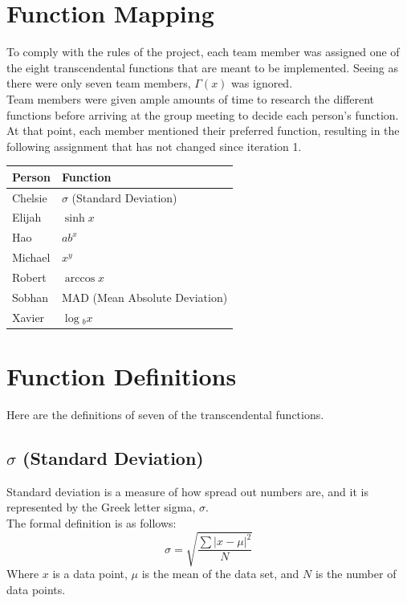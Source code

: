 \documentclass[11pt,onside]{report}
\begin{document}
\section{Function Mapping}
To comply with the rules of the project, each team member was assigned one of the eight transcendental functions that are meant to be implemented. Seeing as there were only seven team members, $\Gamma{}(x)$ was ignored.\\

Team members were given ample amounts of time to research the different functions before arriving at the group meeting to decide each person's function. At that point, each member mentioned their preferred function, resulting in the following assignment that has not changed since iteration 1.
\begin{center}
\begin{tabular}{|l|l|}
    \hline
    \bf{Person} & \bf{Function}  \\
    \hline
    Chelsie & $\sigma{}$ (Standard Deviation) \\
    \hline
    Elijah & $\sinh{x}$ \\
    \hline
    Hao & $ab^x$ \\
    \hline
    Michael & $x^y$ \\
    \hline
    Robert & $\arccos{x}$ \\
    \hline
    Sobhan & MAD (Mean Absolute Deviation) \\
    \hline
    Xavier & $\log{}_bx$ \\
    \hline
\end{tabular}
\end{center}

\section{Function Definitions}
Here are the definitions of seven of the transcendental functions.

\subsection{$\sigma$ (Standard Deviation)}
    Standard deviation is a measure of how spread out numbers are, and it is represented by the Greek letter sigma, $\sigma$. \\
    The formal definition is as follows:
\begin{equation}
    \sigma = \sqrt{\frac{\sum |x-\mu|^2}{N}}
\end{equation}
Where $x$ is a data point, $\mu$ is the mean of the data set, and $N$ is the number of data points. \cite{standard_deviation}
\end{document}
